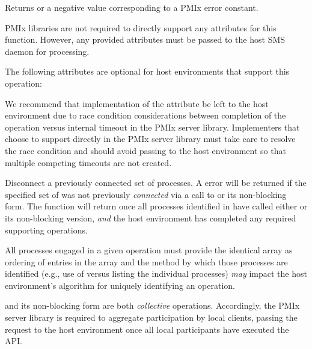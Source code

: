 Returns  or a negative value corresponding to a PMIx error constant.

\reqattrstart
\ac{PMIx} libraries are not required to directly support any attributes for this function. However, any provided attributes must be passed to the host \ac{SMS} daemon for processing.

\reqattrend

\optattrstart
The following attributes are optional for host environments that support this operation:


\optattrend

\adviceimplstart
We recommend that implementation of the  attribute be left to the host environment due to race condition considerations between completion of the operation versus internal timeout in the \ac{PMIx} server library. Implementers that choose to support  directly in the \ac{PMIx} server library must take care to resolve the race condition and should avoid passing  to the host environment so that multiple competing timeouts are not created.
\adviceimplend


\descr

Disconnect a previously connected set of processes.
A  error will be returned if the specified set of  was not previously \textit{connected} via a call to  or its non-blocking form. The function will return once all processes identified in  have called either  or its non-blocking version, \textit{and} the host environment has completed any required supporting operations.

\adviceuserstart
All processes engaged in a given  operation must provide the identical  array as ordering of entries in the array and the method by which those processes are identified (e.g., use of  versus listing the individual processes) \textit{may} impact the host environment's algorithm for uniquely identifying an operation.
\adviceuserend

\adviceimplstart
{} and its non-blocking form are both \emph{collective} operations. Accordingly, the \ac{PMIx} server library is required to aggregate participation by local clients, passing the request to the host environment once all local participants have executed the \ac{API}.
\adviceimplend

